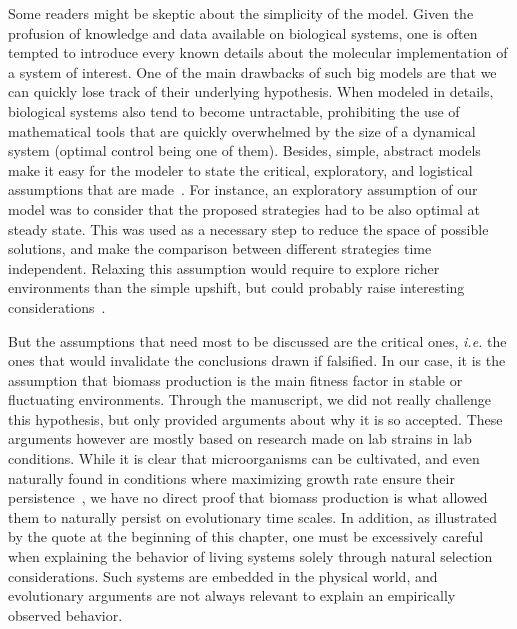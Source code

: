 Some readers might be skeptic about the simplicity of the model.
Given the profusion of knowledge and data available on biological systems, one is often tempted to introduce every known details about the molecular implementation of a system of interest.
One of the main drawbacks of such big models are that we can quickly lose track of their underlying hypothesis.
When modeled in details, biological systems also tend to become untractable, prohibiting the use of mathematical tools that are quickly overwhelmed by the size of a dynamical system (optimal control being one of them).
Besides, simple, abstract models make it easy for the modeler to state the critical, exploratory, and logistical assumptions that are made~\cite{servedio_not_2014}.
For instance, an exploratory assumption of our model was to consider that the proposed strategies had to be also optimal at steady state.
This was used as a necessary step to reduce the space of possible solutions, and make the comparison between different strategies time independent.
Relaxing this assumption would require to explore richer environments than the simple upshift, but could probably raise interesting considerations~\cite{geisel_constitutive_2011,lopez-maury_tuning_2008,lambert_memory_2014,kussell_phenotypic_2005}.

But the assumptions that need most to be discussed are the critical ones, \textit{i.e.} the ones that would invalidate the conclusions drawn if falsified.
In our case, it is the assumption that biomass production is the main fitness factor in stable or fluctuating environments.
Through the manuscript, we did not really challenge this hypothesis, but only provided arguments about why it is so accepted.
These arguments however are mostly based on research made on lab strains in lab conditions.
While it is clear that microorganisms can be cultivated, and even naturally found in conditions where maximizing growth rate ensure their persistence~\cite{edwards_silico_2001,ibarra_escherichia_2002,lewis_omic_2010,molenaar_shifts_2009}, we have no direct proof that biomass production is what allowed them to naturally persist on evolutionary time scales.
In addition, as illustrated by the quote at the beginning of this chapter, one must be excessively careful when explaining the behavior of living systems solely through natural selection considerations.
Such systems are embedded in the physical world, and evolutionary arguments are not always relevant to explain an empirically observed behavior.

